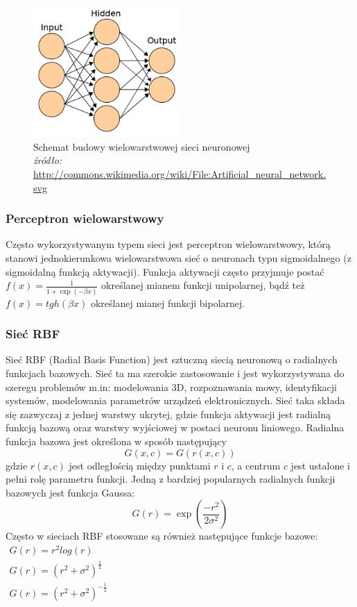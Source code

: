 \begin{figure}
	\centering
	\includegraphics[width=0.5\textwidth]{images/560px-Artificial_neural_network.png}
	\caption{Schemat budowy wielowarstwowej sieci neuronowej \\
	\footnotesize{\textit{źródło:} \url{http://commons.wikimedia.org/wiki/File:Artificial\_neural\_network.svg}} }
	\label{fig:multilayer}
\end{figure}

\subsubsection*{Perceptron wielowarstwowy}
Często wykorzystywanym typem sieci jest perceptron wielowarstwowy, którą stanowi jednokierunkowa wielowarstwowa sieć o neuronach typu sigmoidalnego (z sigmoidalną funkcją aktywacji)\cite{Osowski}. Funkcja aktywacji często przyjmuje postać $f(x) = \frac{1}{1 + \exp(-\beta x)}$ określanej mianem funkcji unipolarnej, bądź też $f(x) = tgh(\beta x)$ określanej mianej funkcji bipolarnej.
 
\subsubsection*{Sieć RBF}
Sieć RBF (Radial Basis Function) jest sztuczną siecią neuronową o radialnych funkcjach bazowych. Sieć ta ma szerokie zastosowanie i jest wykorzystywana do szeregu problemów m.in: modelowania 3D, rozpoznawania mowy, identyfikacji systemów, modelowania parametrów urządzeń elektronicznych\cite{Bors}. Sieć taka składa się zazwyczaj z jednej warstwy ukrytej, gdzie funkcja aktywacji jest radialną funkcją bazową oraz warstwy wyjściowej w postaci neuronu liniowego. Radialna funkcja bazowa jest określona w sposób następujący\cite{Bartkowiak}
\begin{equation}
	G(x,c) = G(r(x,c))
\end{equation}
gdzie $r(x,c)$ jest odległością między punktami $r$ i $c$, a centrum $c$ jest ustalone i pełni rolę parametru funkcji. Jedną z bardziej popularnych radialnych funkcji bazowych jest funkcja Gaussa:
\begin{equation}
	G(r) = \exp(\frac{-r^2}{2\sigma^2})
\end{equation}
Często w sieciach RBF stosowane są również następujące funkcje bazowe\cite{Chen}: \\
$\begin{array}{l}
 G(r) = r^2 log(r)\\
 G(r) = (r^2 + \sigma^2)^{\frac{1}{2}} \\
 G(r) = (r^2 + \sigma^2)^{-\frac{1}{2}}
\end{array}
$
